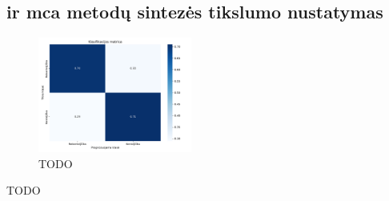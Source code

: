 \subsection{\LIME ir \gls{mca} metodų sintezės tikslumo nustatymas}

\TODO

\begin{figure}[h]
    \centering
    \includegraphics[width=0.45\textwidth]{images/synthesis_2x2.png}
    \caption{TODO}
    \label{fig:exp3:confusion}
\end{figure}

\begin{table}[h]
    \caption{TODO}
    \centering
    \label{tbl:exp3:metrics}
\end{table}
